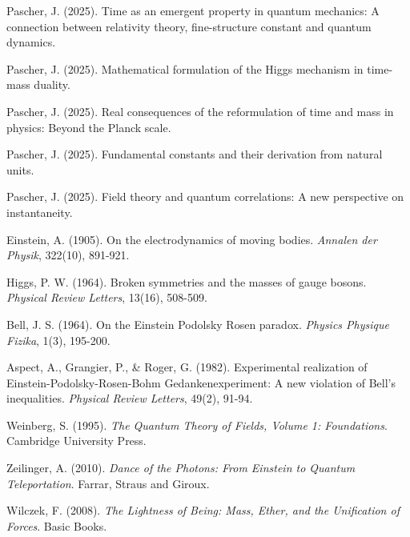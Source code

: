 \documentclass{article}
\theoremstyle{definition}
\theoremstyle{remark}
\begin{document}
	\begin{thebibliography}{99}
		 Pascher, J. (2025). Time as an emergent property in quantum mechanics: A connection between relativity theory, fine-structure constant and quantum dynamics.
		
		 Pascher, J. (2025). Mathematical formulation of the Higgs mechanism in time-mass duality.
		
		 Pascher, J. (2025). Real consequences of the reformulation of time and mass in physics: Beyond the Planck scale.
		
		 Pascher, J. (2025). Fundamental constants and their derivation from natural units.
		
		 Pascher, J. (2025). Field theory and quantum correlations: A new perspective on instantaneity.
		
		 Einstein, A. (1905). On the electrodynamics of moving bodies. \textit{Annalen der Physik}, 322(10), 891-921.
		
		 Higgs, P. W. (1964). Broken symmetries and the masses of gauge bosons. \textit{Physical Review Letters}, 13(16), 508-509.
		
		 Bell, J. S. (1964). On the Einstein Podolsky Rosen paradox. \textit{Physics Physique Fizika}, 1(3), 195-200.
		
		 Aspect, A., Grangier, P., \& Roger, G. (1982). Experimental realization of Einstein-Podolsky-Rosen-Bohm Gedankenexperiment: A new violation of Bell's inequalities. \textit{Physical Review Letters}, 49(2), 91-94.
		
		 Weinberg, S. (1995). \textit{The Quantum Theory of Fields, Volume 1: Foundations}. Cambridge University Press.
		
		 Zeilinger, A. (2010). \textit{Dance of the Photons: From Einstein to Quantum Teleportation}. Farrar, Straus and Giroux.
		
		 Wilczek, F. (2008). \textit{The Lightness of Being: Mass, Ether, and the Unification of Forces}. Basic Books.
	\end{thebibliography}
	
\end{document}
